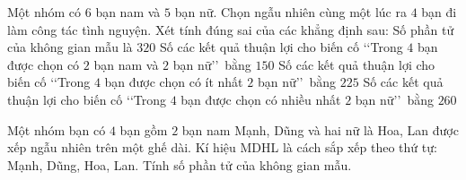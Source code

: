 \begin{ex}%
	Một nhóm  có $6$ bạn nam và $5$ bạn nữ. Chọn ngẫu nhiên cùng một lúc ra $4$ bạn đi làm công tác tình nguyện. Xét tính đúng sai của các khẳng định sau:
	 \choiceTF
		{Số phần  tử của không gian mẫu là $320$}
		{\True Số các kết quả thuận lợi cho biến cố \lq\lq Trong $4$ bạn được chọn  có $2$ bạn nam và $2$ bạn nữ\rq\rq\, bằng $150$}
		{Số các kết quả thuận lợi cho biến cố \lq\lq Trong $4$  bạn được chọn có ít nhất $2$ bạn nữ\rq\rq\, bằng $225$}
		{Số các kết  quả thuận lợi cho biến cố \lq\lq Trong $4$ bạn được chọn có nhiều nhất $2$ bạn nữ\rq\rq\, bằng $260$}
\end{ex}



\begin{bt}%
	Một nhóm bạn có $4$ bạn gồm $2$ bạn nam Mạnh, Dũng và hai nữ là Hoa, Lan được xếp ngẫu nhiên trên một  ghế dài. Kí hiệu MDHL là cách sắp xếp theo thứ tự: Mạnh, Dũng, Hoa, Lan. Tính số phần tử của không gian mẫu.
\end{bt}

